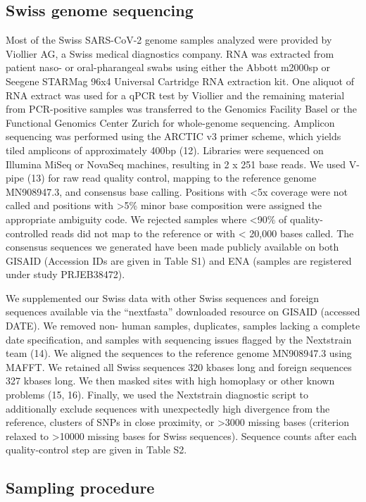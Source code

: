 \documentclass[9pt,twocolumn,twoside,lineno]{pnas-new}
\begin{document}
\subsection{Swiss genome sequencing}
Most of the Swiss SARS-CoV-2 genome samples analyzed were provided by Viollier AG, a Swiss medical diagnostics company. RNA was extracted from patient naso- or oral-pharangeal swabs using either the Abbott m2000sp or Seegene STARMag 96x4 Universal Cartridge RNA extraction kit. One aliquot of RNA extract was used for a qPCR test by Viollier and the remaining material from PCR-positive samples was transferred to the Genomics Facility Basel or the Functional Genomics Center Zurich for whole-genome sequencing. Amplicon sequencing was performed using the ARCTIC v3 primer scheme, which yields tiled amplicons of approximately 400bp (12). Libraries were sequenced on Illumina MiSeq or NovaSeq machines, resulting in 2 x 251 base reads. We used V-pipe (13) for raw read quality control, mapping to the reference genome MN908947.3, and consensus base calling. Positions with <5x coverage were not called and positions with >5\% minor base composition were assigned the appropriate ambiguity code. We rejected samples where <90\% of quality-controlled reads did not map to the reference or with < 20,000 bases called. The consensus sequences we generated have been made publicly available on both GISAID (Accession IDs are given in Table S1) and ENA (samples are registered under study PRJEB38472).

We supplemented our Swiss data with other Swiss sequences and foreign sequences available via the ``nextfasta” downloaded resource on GISAID (accessed DATE). We removed non- human samples, duplicates, samples lacking a complete date specification, and samples with sequencing issues flagged by the Nextstrain team (14). We aligned the sequences to the reference genome MN908947.3 using MAFFT. We retained all Swiss sequences 320 kbases long and foreign sequences 327 kbases long. We then masked sites with high homoplasy or other known problems (15, 16). Finally, we used the Nextstrain diagnostic script to additionally exclude sequences with unexpectedly high divergence from the reference, clusters of SNPs in close proximity, or >3000 missing bases (criterion relaxed to >10000 missing bases for Swiss sequences). Sequence counts after each quality-control step are given in Table S2.

\subsection{Sampling procedure}
\end{document}
